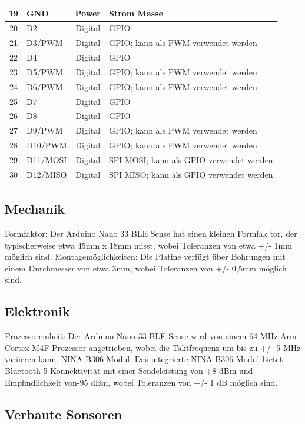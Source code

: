 \begin{longtable}{|c|p{2cm}|c|p{6.5cm}|}
	\hline
	19 & GND & Power & Strom Masse \\
	\hline
	20 & D2 & Digital & GPIO \\
	\hline
	21 & D3/PWM & Digital & GPIO; kann als PWM verwendet werden \\
	\hline
	22 & D4 & Digital & GPIO \\
	\hline
	23 & D5/PWM & Digital & GPIO; kann als PWM verwendet werden \\
	\hline
	24 & D6/PWM & Digital & GPIO; kann als PWM verwendet werden \\
	\hline
	25 & D7 & Digital & GPIO \\
	\hline
	26 & D8 & Digital & GPIO \\
	\hline
	27 & D9/PWM & Digital & GPIO; kann als PWM verwendet werden \\
	\hline
	28 & D10/PWM & Digital & GPIO; kann als PWM verwendet werden \\
	\hline
	29 & D11/MOSI & Digital & SPI MOSI; kann als GPIO verwendet werden \\
	\hline
	30 & D12/MISO & Digital & SPI MISO; kann als GPIO verwendet werden \\
	\hline
	
\end{longtable}

\subsection{Mechanik}
Formfaktor: Der Arduino Nano 33 BLE Sense hat einen kleinen Formfak
tor, der typischerweise etwa 45mm x 18mm misst, wobei Toleranzen von
etwa +/- 1mm möglich sind. Montagemöglichkeiten: Die Platine verfügt
über Bohrungen mit einem Durchmesser von etwa 3mm, wobei Toleranzen
von +/- 0,5mm möglich sind. \cite{Arduino:2025}

\subsection{Elektronik}
Prozessoreinheit: Der Arduino Nano 33 BLE Sense wird von einem 64 MHz
Arm Cortex-M4F Prozessor angetrieben, wobei die Taktfrequenz um bis
zu +/- 5 MHz variieren kann. NINA B306 Modul: Das integrierte NINA
B306 Modul bietet Bluetooth 5-Konnektivität mit einer Sendeleistung
von +8 dBm und Empfindlichkeit von-95 dBm, wobei Toleranzen von
+/- 1 dB möglich sind. \cite{Arduino:2025}

\subsection{Verbaute Sonsoren}

